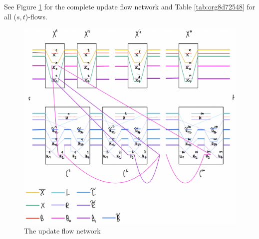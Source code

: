 \documentclass[fontsize=11pt,paper=a4]{book}
\begin{document}
See Figure \ref{fig:orga03570d} for the complete update flow network and Table \ref{tab:org8d72548} for all (\(s,t\))-flows.

\begin{figure}[htbp]
\centering
\includegraphics[width=.9\linewidth]{../assets/Screen Shot 2023-02-14 at 15.08.01.png}
\caption{\label{fig:orga03570d}The update flow network}
\end{figure}
\end{document}
